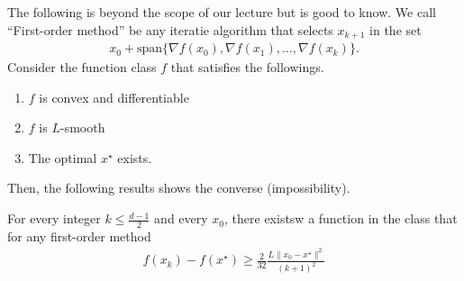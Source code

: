 \documentclass{article}
\begin{document}
The following is beyond the scope of our lecture but is good to know.
We call ``First-order method'' be any iteratie algorithm that selects $x_{k+1}$ in the set
\begin{align}
    x_0 + \mbox{span} \{ \nabla f(x_0), \nabla f(x_1), \dots, \nabla f(x_k)\}.
\end{align}
Consider the function class $f$ that satisfies the followings.
\begin{enumerate}
    \item $f$ is convex and differentiable
    \item $f$ is $L$-smooth
    \item The optimal $x^\star$ exists.
\end{enumerate}
Then, the following results shows the converse (impossibility).

\begin{theorem}
For every integer $k\leq\frac{d-1}{2}$ and every $x_0$, there existsw a function in the class that for any first-order method
\begin{align}
    f(x_k) - f(x^\star) \geq \frac{2}{32} \frac{L \|x_0-x^\star\|^2}{(k+1)^2}
\end{align}
\end{theorem}
\end{document}

